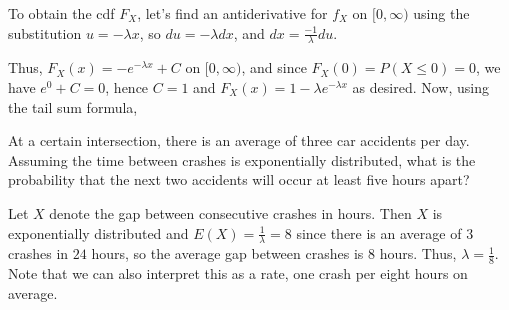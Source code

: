 \begin{pf} To obtain the cdf $F_X$, let's find an antiderivative for $f_X$ on $[0, \infty)$ using the substitution $u  = - \lambda x$, so $du = - \lambda dx$, and $dx = \frac{-1}{\lambda} du$.
\par
\noindent Thus, $F_X(x) = -e^{-\lambda x} + C$ on $[0,\infty)$, and since $F_X(0) = P(X \leq 0) = 0$, we have $e^{0} + C = 0$, hence $C = 1$ and $F_X(x) = 1 - \lambda e^{-\lambda x}$ as desired. Now, using the tail sum formula,
\end{pf}
\begin{examp}At a certain intersection, there is an average of three car accidents per day. Assuming the time between crashes is exponentially distributed, what is the probability that the next two accidents will occur at least five hours apart?
\par
\noindent Let $X$ denote the gap between consecutive crashes in hours. Then $X$ is exponentially distributed and $E(X) = \frac{1}{\lambda} = 8$ since there is an average of $3$ crashes in $24$ hours, so the average gap between crashes is $8$ hours. Thus, $\lambda = \frac{1}{8}$. Note that we can also interpret this as a rate, one crash per eight hours on average. 
\end{examp}
